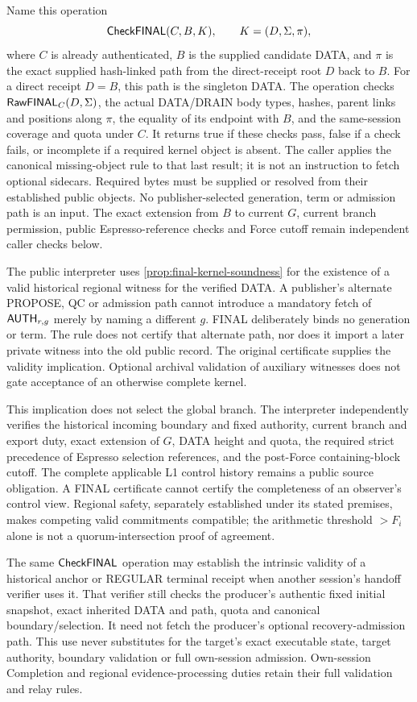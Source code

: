 Name this operation
\[
 \mathsf{CheckFINAL}(C,B,K),\qquad K=(D,\Sigma,\pi),
\]
where $C$ is already authenticated, $B$ is the supplied candidate DATA,
and $\pi$ is the exact supplied hash-linked path from the direct-receipt
root $D$ back to $B$. For a direct receipt $D=B$, this path is the
singleton DATA. The operation checks $\mathsf{RawFINAL}_C(D,\Sigma)$,
the actual DATA/DRAIN body types, hashes, parent links and positions
along $\pi$, the equality of its endpoint with $B$, and the same-session
coverage and quota under $C$. It returns true if these checks pass,
false if a check fails, or incomplete if a required kernel object is
absent. The caller applies the canonical missing-object rule to that
last result; it is not an instruction to fetch optional sidecars.
Required bytes must be supplied or resolved from their established
public objects. No publisher-selected generation, term or admission
path is an input. The exact extension from $B$ to current $G$, current
branch permission, public Espresso-reference checks and Force cutoff
remain independent caller checks below.

The public interpreter uses \cref{prop:final-kernel-soundness} for the
existence of a valid historical regional witness for the verified DATA.
A publisher's alternate PROPOSE, QC or
admission path cannot introduce a mandatory fetch of
$\mathsf{AUTH}_{r,g}$ merely by naming a different $g$. FINAL deliberately
binds no generation or term. The rule does not certify that alternate
path, nor does it import a later private witness into the old public
record. The original certificate supplies the validity implication.
Optional archival validation of auxiliary witnesses does not gate
acceptance of an otherwise complete kernel.

This implication does not select the global branch. The interpreter
independently verifies the historical incoming boundary and fixed
authority, current branch and export duty, exact extension of $G$,
DATA height and quota, the required strict precedence of Espresso
selection references, and the post-Force containing-block cutoff.
The complete applicable L1 control history remains a public source
obligation. A FINAL certificate cannot certify the completeness of an
observer's control view. Regional safety, separately established under
its stated premises, makes competing valid commitments compatible;
the arithmetic threshold $>F_i$ alone is not a quorum-intersection
proof of agreement.

The same $\mathsf{CheckFINAL}$ operation may establish the intrinsic
validity of a historical anchor or REGULAR terminal receipt when
another session's handoff verifier uses it. That verifier still checks
the producer's authentic fixed initial snapshot, exact inherited DATA
and path, quota and canonical boundary/selection. It need not fetch
the producer's optional recovery-admission path. This use never
substitutes for the target's exact executable state, target authority,
boundary validation or full own-session admission. Own-session
Completion and regional evidence-processing duties retain their full
validation and relay rules.

